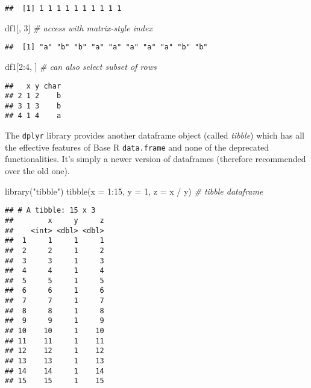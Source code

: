 \documentclass[
  oneside]{book}
\newenvironment{Shaded}{\begin{snugshade}}{\end{snugshade}}
\newcommand{\AttributeTok}[1]{\textcolor[rgb]{0.77,0.63,0.00}{#1}}
\newcommand{\CommentTok}[1]{\textcolor[rgb]{0.56,0.35,0.01}{\textit{#1}}}
\newcommand{\DecValTok}[1]{\textcolor[rgb]{0.00,0.00,0.81}{#1}}
\newcommand{\FunctionTok}[1]{\textcolor[rgb]{0.00,0.00,0.00}{#1}}
\newcommand{\NormalTok}[1]{#1}
\newcommand{\SpecialCharTok}[1]{\textcolor[rgb]{0.00,0.00,0.00}{#1}}
\newcommand{\StringTok}[1]{\textcolor[rgb]{0.31,0.60,0.02}{#1}}
\begin{document}
\begin{verbatim}
##  [1] 1 1 1 1 1 1 1 1 1 1
\end{verbatim}

\begin{Shaded}
\begin{Highlighting}[]
\NormalTok{df1[, }\DecValTok{3}\NormalTok{] }\CommentTok{\# access with matrix{-}style index}
\end{Highlighting}
\end{Shaded}

\begin{verbatim}
##  [1] "a" "b" "b" "a" "a" "a" "a" "a" "b" "b"
\end{verbatim}

\begin{Shaded}
\begin{Highlighting}[]
\NormalTok{df1[}\DecValTok{2}\SpecialCharTok{:}\DecValTok{4}\NormalTok{, ] }\CommentTok{\# can also select subset of rows}
\end{Highlighting}
\end{Shaded}

\begin{verbatim}
##   x y char
## 2 1 2    b
## 3 1 3    b
## 4 1 4    a
\end{verbatim}

The \texttt{dplyr} library provides another dataframe object (called \emph{tibble}) which has all
the effective features of Base R \texttt{data.frame} and none of the
deprecated functionalities. It's simply a newer version of dataframes (therefore
recommended over the old one).

\begin{Shaded}
\begin{Highlighting}[]
\FunctionTok{library}\NormalTok{(}\StringTok{"tibble"}\NormalTok{)}
\FunctionTok{tibble}\NormalTok{(}\AttributeTok{x =} \DecValTok{1}\SpecialCharTok{:}\DecValTok{15}\NormalTok{, }\AttributeTok{y =} \DecValTok{1}\NormalTok{, }\AttributeTok{z =}\NormalTok{ x }\SpecialCharTok{/}\NormalTok{ y) }\CommentTok{\# tibble dataframe}
\end{Highlighting}
\end{Shaded}

\begin{verbatim}
## # A tibble: 15 x 3
##        x     y     z
##    <int> <dbl> <dbl>
##  1     1     1     1
##  2     2     1     2
##  3     3     1     3
##  4     4     1     4
##  5     5     1     5
##  6     6     1     6
##  7     7     1     7
##  8     8     1     8
##  9     9     1     9
## 10    10     1    10
## 11    11     1    11
## 12    12     1    12
## 13    13     1    13
## 14    14     1    14
## 15    15     1    15
\end{verbatim}
\end{document}
